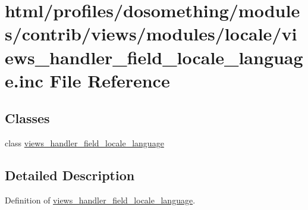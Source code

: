\hypertarget{views__handler__field__locale__language_8inc}{
\section{html/profiles/dosomething/modules/contrib/views/modules/locale/views\_\-handler\_\-field\_\-locale\_\-language.inc File Reference}
\label{views__handler__field__locale__language_8inc}
}
\subsection*{Classes}
\begin{DoxyCompactItemize}
\item 
class \hyperlink{classviews__handler__field__locale__language}{views\_\-handler\_\-field\_\-locale\_\-language}
\end{DoxyCompactItemize}


\subsection{Detailed Description}
Definition of \hyperlink{classviews__handler__field__locale__language}{views\_\-handler\_\-field\_\-locale\_\-language}. 